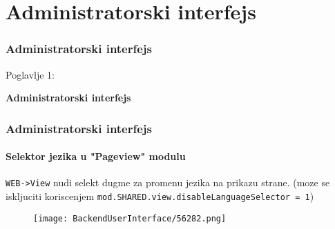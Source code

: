 %

\section{Administratorski interfejs}
\begin{frame}[fragile]
	\frametitle{Administratorski interfejs}

	\begin{center}\huge{Poglavlje 1:}\end{center}
	\begin{center}\huge{\color{typo3darkgrey}\textbf{Administratorski interfejs}}\end{center}

\end{frame}

\begin{frame}[fragile]
	\frametitle{Administratorski interfejs}
	\framesubtitle{Selektor jezika u "Pageview" modulu}


	\texttt{WEB->View} nudi selekt dugme za promenu jezika na prikazu strane.\newline
	\smaller
		(moze se iskljuciti koriscenjem \texttt{mod.SHARED.view.disableLanguageSelector = 1})
	\normalsize

	\begin{figure}
		\texttt{[image: BackendUserInterface/56282.png]}
	\end{figure}

\end{frame}

